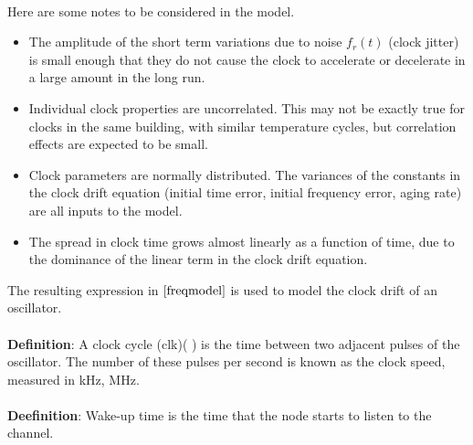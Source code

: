 \documentclass[a4paper,10pt]{report}
\begin{document}
\paragraph*{}
Here are some notes to be considered in the model.
\begin{itemize}
\item The amplitude of the short term variations due to noise $f_r(t)$ (clock jitter) is small enough that they do not cause the clock to
accelerate or decelerate in a large amount in the long run.
\item Individual clock properties are uncorrelated. This may not be exactly true for clocks in the same building, with similar temperature cycles, but correlation effects are expected to be small.
\item Clock parameters are normally distributed. The variances of the constants in the clock drift equation (initial time error,
initial frequency error, aging rate) are all inputs to the model.
\item The spread in clock time grows almost linearly as a function of time, due to the dominance of the linear term in the clock drift equation.
\end{itemize}
The resulting expression in $\ref{freqmodel}$ is used to model the clock drift of an oscillator.
\paragraph*{}
\textbf{Definition}: A clock cycle (clk)( )
is the time between two adjacent pulses of the oscillator. The
number of these pulses per second is known as the clock speed,
measured in kHz, MHz.\paragraph*{}
\textbf{Deefinition}: Wake-up time  is the time that the node starts to listen to the channel.
\end{document}
